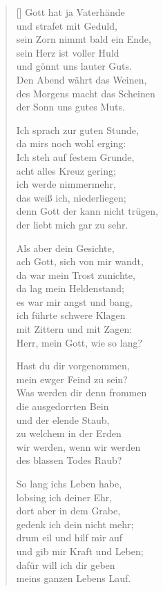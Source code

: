\begin{multicols}{2}
\begin{verse}[\versewidth]
 Gott hat ja Vaterhände\\
und strafet mit Geduld,\\
sein Zorn nimmt bald ein Ende,\\
sein Herz ist voller Huld\\
und gönnt uns lauter Guts.\\
Den Abend währt das Weinen,\\
des Morgens macht das Scheinen\\
der Sonn uns gutes Muts.

 Ich sprach zur guten Stunde,\\
da mirs noch wohl erging:\\
Ich steh auf festem Grunde,\\
acht alles Kreuz gering;\\
ich werde nimmermehr,\\
das weiß ich, niederliegen;\\
denn Gott der kann nicht trügen,\\
der liebt mich gar zu sehr.

 Als aber dein Gesichte,\\
ach Gott, sich von mir wandt,\\
da war mein Trost zunichte,\\
da lag mein Heldenstand;\\
es war mir angst und bang,\\
ich führte schwere Klagen\\
mit Zittern und mit Zagen:\\
Herr, mein Gott, wie so lang?

 Hast du dir vorgenommen,\\
mein ewger Feind zu sein?\\
Was werden dir denn frommen\\
die ausgedorrten Bein\\
und der elende Staub,\\
zu welchem in der Erden\\
wir werden, wenn wir werden\\
des blassen Todes Raub?

 So lang ichs Leben habe,\\
lobsing ich deiner Ehr,\\
dort aber in dem Grabe,\\
gedenk ich dein nicht mehr;\\
drum eil und hilf mir auf\\
und gib mir Kraft und Leben;\\
dafür will ich dir geben\\
meins ganzen Lebens Lauf.


\end{verse}
\end{multicols}
